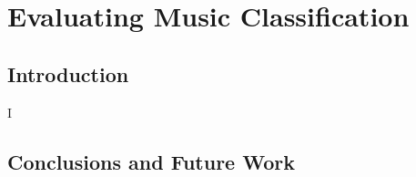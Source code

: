 \chapter{Evaluating Music Classification} \label{section:chapter5}



\section{Introduction}


I\blindtext

 

\section{Conclusions and Future Work}\label{section:conc}

\blindtext






